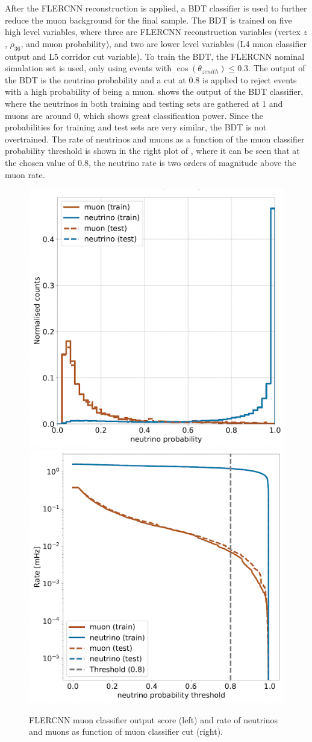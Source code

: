 After the FLERCNN reconstruction is applied, a BDT classifier is used to further reduce the muon background for the final sample. The BDT is trained on five high level variables, where three are FLERCNN reconstruction variables (vertex $z$, $\rho_{36}$, and muon probability), and two are lower level variables (L4 muon classifier output and L5 corridor cut variable). To train the BDT, the FLERCNN nominal simulation set is used, only using events with $\cos(\theta_{zenith})\leq 0.3$. The output of the BDT is the neutrino probability and a cut at 0.8 is applied to reject events with a high probability of being a muon.  shows the output of the BDT classifier, where the neutrinos in both training and testing sets are gathered at 1 and muons are around 0, which shows great classification power. Since the probabilities for training and test sets are very similar, the BDT is not overtrained. The rate of neutrinos and muons as a function of the muon classifier probability threshold is shown in the right plot of , where it can be seen that at the chosen value of 0.8, the neutrino rate is two orders of magnitude above the muon rate.

\begin{figure}
\includegraphics[width=0.49\linewidth]{figures/simulation_and_processing/flercnn/flercnn_muon_classifier.png}
\includegraphics[width=0.49\linewidth]{figures/simulation_and_processing/flercnn/flercnn_muon_classifier_rate_vs_threshold.png}
\caption[FLERCNN muon classifier probability distributions]{FLERCNN muon classifier output score (left) and rate of neutrinos and muons as function of muon classifier cut (right).}
\end{figure}

